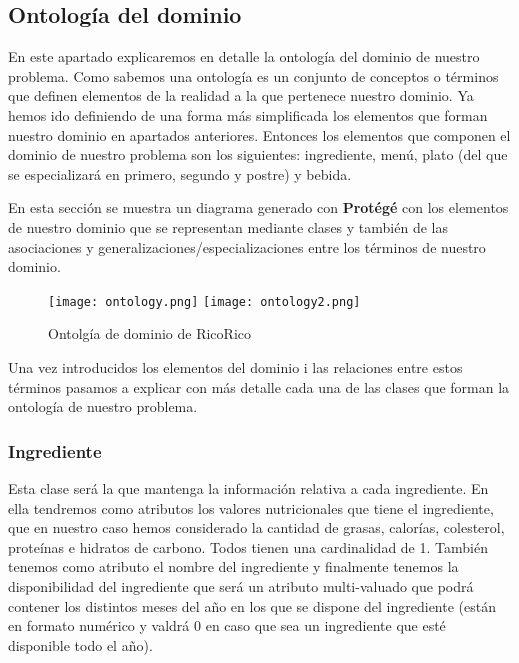 \documentclass{article}
\begin{document}
\subsection{Ontología del dominio}
En este apartado explicaremos en detalle la ontología del dominio de nuestro problema. Como sabemos una ontología es un conjunto de conceptos o términos que definen elementos de la realidad a la que pertenece nuestro dominio. Ya hemos ido definiendo de una forma más simplificada los elementos que forman nuestro dominio en apartados anteriores. Entonces los elementos que componen el dominio de nuestro problema son los siguientes: ingrediente, menú, plato (del que se especializará en primero, segundo y postre) y bebida.\par
En esta sección se muestra un diagrama generado con \textbf{Protégé} con los elementos de nuestro dominio que se representan mediante clases y también de las asociaciones y generalizaciones/especializaciones entre los términos de nuestro dominio.
\begin{figure}
    \centering
    \texttt{[image: ontology.png]}\hfill
    \texttt{[image: ontology2.png]}
    \caption{Ontolgía de dominio de RicoRico}
    \label{fig:ontology}
\end{figure}
\par
Una vez introducidos los elementos del dominio i las relaciones entre estos términos pasamos a explicar con más detalle cada una de las clases que forman la ontología de nuestro problema.

\subsubsection{Ingrediente}
Esta clase será la que mantenga la información relativa a cada ingrediente. En ella tendremos como atributos los valores nutricionales que tiene el ingrediente, que en nuestro caso hemos considerado la cantidad de grasas, calorías, colesterol, proteínas e hidratos de carbono. Todos tienen una cardinalidad de 1.
También tenemos como atributo el nombre del ingrediente y finalmente tenemos la disponibilidad del ingrediente que será un atributo multi-valuado que podrá contener los distintos meses del año en los que se dispone del ingrediente (están en formato numérico y valdrá 0 en caso que sea un ingrediente que esté disponible todo el año).
\end{document}
